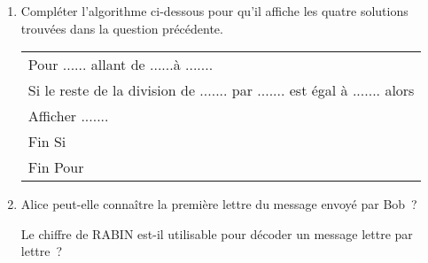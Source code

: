 \begin{enumerate}
     \item Compléter l'algorithme ci-dessous pour qu'il affiche les quatre solutions trouvées dans la
     question précédente.
     \begin{center}
          \begin{extern}%
               \begin{tabularx}{0.7\linewidth}{|X|}\hline
                    Pour ...... allant de ......à .......\\
                    \quad Si le reste de la division de ....... par ....... est égal à ....... alors\\
                    \qquad Afficher .......\\
                    \quad Fin Si\\
                    Fin Pour\\ \hline
               \end{tabularx}
          \end{extern}
     \end{center}
     \item Alice peut-elle connaître la première lettre du message envoyé par Bob~? \\
     \par
     Le \og chiffre de RABIN \fg{} est-il utilisable pour décoder un message lettre par lettre~?
\end{enumerate}
